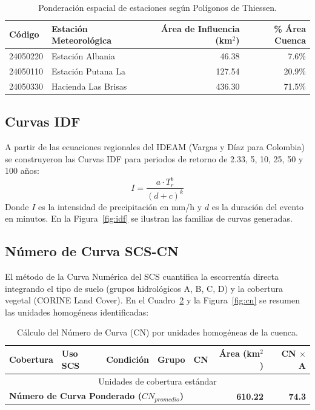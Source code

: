 \documentclass[11pt,a4paper]{article}
\begin{document}
\begin{table}[H]
\centering
\caption{Ponderación espacial de estaciones según Polígonos de Thiessen.}
\label{tab:thiessen}
\begin{tabular}{llrr}\toprule
\textbf{Código} & \textbf{Estación Meteorológica} & \textbf{Área de Influencia (km$^2$)} & \textbf{\% Área Cuenca} \\\midrule
24050220 & Estación Albania & 46.38 & 7.6\% \\
24050110 & Estación Putana La & 127.54 & 20.9\% \\
24050330 & Hacienda Las Brisas & 436.30 & 71.5\% \\
\bottomrule
\end{tabular}
\end{table}



\subsection{Curvas IDF}
A partir de las ecuaciones regionales del IDEAM (Vargas y Díaz para Colombia) se construyeron las Curvas IDF para periodos de retorno de 2.33, 5, 10, 25, 50 y 100 años:
\begin{equation}
I = \frac{a \cdot T_r^b}{(d + c)^k}
\end{equation}
Donde $I$ es la intensidad de precipitación en mm/h y $d$ es la duración del evento en minutos. En la Figura~\ref{fig:idf} se ilustran las familias de curvas generadas.



\subsection{Número de Curva SCS-CN}
El método de la Curva Numérica del SCS cuantifica la escorrentía directa integrando el tipo de suelo (grupos hidrológicos A, B, C, D) y la cobertura vegetal (CORINE Land Cover). En el Cuadro~\ref{tab:cn} y la Figura~\ref{fig:cn} se resumen las unidades homogéneas identificadas:

\begin{table}[H]
\centering
\caption{Cálculo del Número de Curva (CN) por unidades homogéneas de la cuenca.}
\label{tab:cn}
%
\begin{tabular}{llllrrr}\toprule
\textbf{Cobertura} & \textbf{Uso SCS} & \textbf{Condición} & \textbf{Grupo} & \textbf{CN} & \textbf{Área (km$^2$)} & \textbf{CN $\times$ A} \\\midrule
\multicolumn{7}{c}{Unidades de cobertura estándar} \\
\midrule
\multicolumn{5}{l}{\textbf{Número de Curva Ponderado ($CN_{promedio}$)}} & \textbf{610.22} & \textbf{74.3} \\
\bottomrule
\end{tabular}
\end{table}
\end{document}

